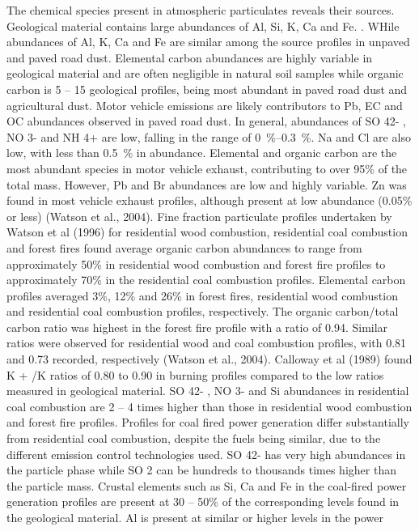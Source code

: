 \documentclass{nwureport}
\begin{document}
The chemical species present in atmospheric particulates reveals their sources. Geological material contains
large abundances of Al, Si, K, Ca and Fe. . WHile abundances of Al, K, Ca and Fe are similar among the
source profiles in unpaved and paved road dust. Elemental carbon abundances are highly variable in
geological material and are often negligible in natural soil samples while organic carbon is 5 – 15%
geological profiles, being most abundant in paved road dust and agricultural dust. Motor vehicle emissions
are likely contributors to Pb, EC and OC abundances observed in paved road dust. In general, abundances
of SO 42- , NO 3- and NH 4+ are low, falling in the range of \SIrange{0}{0.3}{\percent}. Na and Cl are also low, with less than \SI{0.5}{\percent}
in abundance. Elemental and organic carbon are the most abundant species in motor vehicle exhaust,
contributing to over 95\% of the total mass. However, Pb and Br abundances are low and highly variable. Zn
was found in most vehicle exhaust profiles, although present at low abundance (0.05\% or less) (Watson et
al., 2004). Fine fraction particulate profiles undertaken by Watson et al (1996) for residential wood
combustion, residential coal combustion and forest fires found average organic carbon abundances to range
from approximately 50\% in residential wood combustion and forest fire profiles to approximately 70\% in the
residential coal combustion profiles. Elemental carbon profiles averaged 3\%, 12\% and 26\% in forest fires,
residential wood combustion and residential coal combustion profiles, respectively. The organic carbon/total
carbon ratio was highest in the forest fire profile with a ratio of 0.94. Similar ratios were observed for
residential wood and coal combustion profiles, with 0.81 and 0.73 recorded, respectively (Watson et al.,
2004). Calloway et al (1989) found K + /K ratios of 0.80 to 0.90 in burning profiles compared to the low ratios
measured in geological material. SO 42- , NO 3- and Si abundances in residential coal combustion are 2 – 4
times higher than those in residential wood combustion and forest fire profiles.
Profiles for coal fired power generation differ substantially from residential coal combustion, despite the fuels
being similar, due to the different emission control technologies used. SO 42- has very high abundances in the
particle phase while SO 2 can be hundreds to thousands times higher than the particle mass. Crustal
elements such as Si, Ca and Fe in the coal-fired power generation profiles are present at 30 – 50\% of the
corresponding levels found in the geological material. Al is present at similar or higher levels in the power
\end{document}
